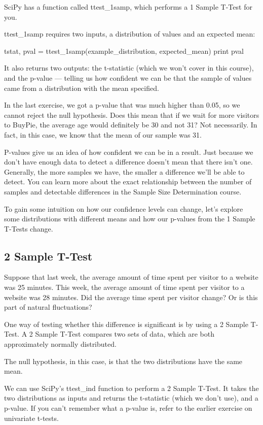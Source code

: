 \documentclass{journal}
\begin{document}
SciPy has a function called ttest_1samp, which performs a 1 Sample T-Test for you.

ttest_1samp requires two inputs, a distribution of values and an expected mean:

tstat, pval = ttest_1samp(example_distribution, expected_mean)
print pval

It also returns two outputs: the t-statistic (which we won't cover in this course), and the p-value — telling us how confident we can be that the sample of values came from a distribution with the mean specified.

In the last exercise, we got a p-value that was much higher than 0.05, so we cannot reject the null hypothesis. Does this mean that if we wait for more visitors to BuyPie, the average age would definitely be 30 and not 31? Not necessarily. In fact, in this case, we know that the mean of our sample was 31.

P-values give us an idea of how confident we can be in a result. Just because we don’t have enough data to detect a difference doesn’t mean that there isn’t one. Generally, the more samples we have, the smaller a difference we’ll be able to detect. You can learn more about the exact relationship between the number of samples and detectable differences in the Sample Size Determination course.

To gain some intuition on how our confidence levels can change, let's explore some distributions with different means and how our p-values from the 1 Sample T-Tests change.

\subsection{2 Sample T-Test}
Suppose that last week, the average amount of time spent per visitor to a website was 25 minutes. This week, the average amount of time spent per visitor to a website was 28 minutes. Did the average time spent per visitor change? Or is this part of natural fluctuations?

One way of testing whether this difference is significant is by using a 2 Sample T-Test. A 2 Sample T-Test compares two sets of data, which are both approximately normally distributed.

The null hypothesis, in this case, is that the two distributions have the same mean.

We can use SciPy's ttest_ind function to perform a 2 Sample T-Test. It takes the two distributions as inputs and returns the t-statistic (which we don't use), and a p-value. If you can't remember what a p-value is, refer to the earlier exercise on univariate t-tests.
\end{document}
